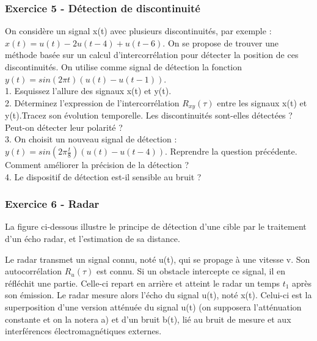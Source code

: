 \documentclass[11pt]{report}
\begin{document}
	\vspace{1\baselineskip}	
	
	\subsubsection{Exercice 5 - Détection de discontinuité}
	
	On considère un signal x(t) avec plusieurs discontinuités, par exemple : $x(t)=u(t)-2u(t-4)+u(t-6)$. On se propose de trouver une méthode basée sur un calcul d'intercorrélation pour détecter la position de ces discontinuités. On utilise comme signal de détection la fonction $y(t)=sin(2\pi t)(u(t)-u(t-1))$.\\
	
	1. Esquissez l'allure des signaux x(t) et y(t).\\
	
	2. Déterminez l'expression de l'intercorrélation $R_{xy}(\tau)$ entre les signaux x(t) et y(t).Tracez son évolution temporelle. Les discontinuités sont-elles détectées ? Peut-on détecter leur polarité ?\\
	
	3. On choisit un nouveau signal de détection : $y(t)=sin(2\pi \frac{t}{8})(u(t)-u(t-4))$. Reprendre la question précédente. Comment améliorer la précision de la détection ? \\
	
	4. Le dispositif de détection est-il sensible au bruit ?\\
	
	\vspace{1\baselineskip}	
	
	\subsubsection{Exercice 6 - Radar}
	
	La figure ci-dessous illustre le principe de détection d'une cible par le traitement d'un écho radar, et l'estimation de sa distance.
	
	Le radar transmet un signal connu, noté u(t), qui se propage à une vitesse v. Son autocorrélation $R_{u}(\tau)$ est connu. Si un obstacle intercepte ce signal, il en réfléchit une partie. Celle-ci repart en arrière et atteint le radar un temps $t_{1}$ après son émission. Le radar mesure alors l'écho du signal u(t), noté x(t). Celui-ci est la superposition d'une version atténuée du signal u(t) (on supposera l'atténuation constante et on la notera a) et d'un bruit b(t), lié au bruit de mesure et aux interférences électromagnétiques externes.\\
	
\end{document}
